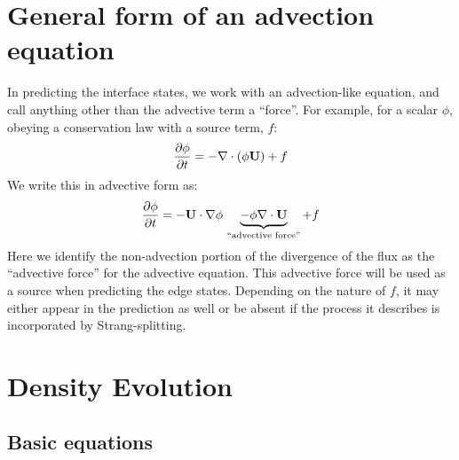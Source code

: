 
\section{General form of an advection equation}
In predicting the interface states, we work with an advection-like
equation, and call anything other than the advective term a ``force''.
For example, for a scalar $\phi$, obeying a conservation law with a source term, $f$:
\begin{equation}
\frac{\partial \phi}{\partial t} = -\nabla \cdot (\phi {\bf U}) + f
\end{equation}
We write this in advective form as:
\begin{equation}
\frac{\partial \phi}{\partial t} = -{\bf U} \cdot \nabla \phi \, \underbrace{- \phi \nabla \cdot {\bf U}}_{\text{``advective force''}} + f
\end{equation}
Here we identify the non-advection portion of the divergence of the
flux as the ``advective force'' for the advective equation.  This
advective force will be used as a source when predicting the edge
states.  Depending on the nature of $f$, it may either appear in the
prediction as well or be absent if the process it describes is
incorporated by Strang-splitting.


\section{Density Evolution}

\subsection{Basic equations}

